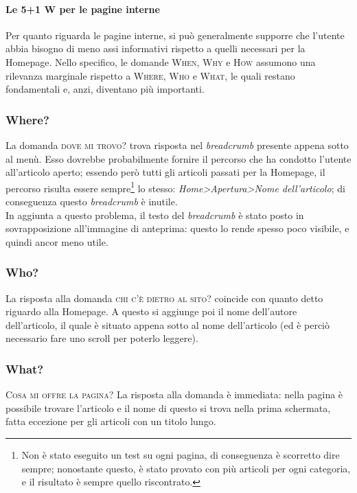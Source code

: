 \paragraph*{Le 5+1 W per le pagine interne} Per quanto riguarda le pagine interne, si può generalmente supporre che l'utente abbia bisogno di meno assi informativi rispetto a quelli necessari per la Homepage. Nello specifico, le domande \textsc{When}, \textsc{Why} e \textsc{How} assumono una rilevanza marginale rispetto a \textsc{Where}, \textsc{Who} e \textsc{What}, le quali restano fondamentali e, anzi, diventano più importanti.

\subsubsection{Where?}
La domanda \textsc{dove mi trovo?} trova risposta nel \textit{breadcrumb} presente appena sotto al menù. Esso dovrebbe probabilmente fornire il percorso che ha condotto l'utente all'articolo aperto; essendo però tutti gli articoli passati per la Homepage, il percorso risulta essere sempre\footnote{Non è stato eseguito un test su ogni pagina, di conseguenza è scorretto dire sempre; nonostante questo, è stato provato con più articoli per ogni categoria, e il risultato è sempre quello riscontrato.} lo stesso: \textit{Home\textgreater}\textit{Apertura\textgreater}\textit{Nome dell'articolo}; di conseguenza questo \textit{breadcrumb} è inutile.\\
In aggiunta a questo problema, il testo del \textit{breadcrumb} è stato posto in sovrapposizione all'immagine di anteprima: questo lo rende spesso poco visibile, e quindi ancor meno utile. \\

\subsubsection{Who?}
La risposta alla domanda \textsc{chi c'è dietro al sito?} coincide con quanto detto riguardo alla Homepage. A questo si aggiunge poi il nome dell'autore dell'articolo, il quale è situato appena sotto al nome dell'articolo (ed è perciò necessario fare uno scroll per poterlo leggere).

\subsubsection{What?}
\textsc{Cosa mi offre la pagina?} La risposta alla domanda è immediata: nella pagina è possibile trovare l'articolo e il nome di questo si trova nella prima schermata, fatta eccezione per gli articoli con un titolo lungo.

